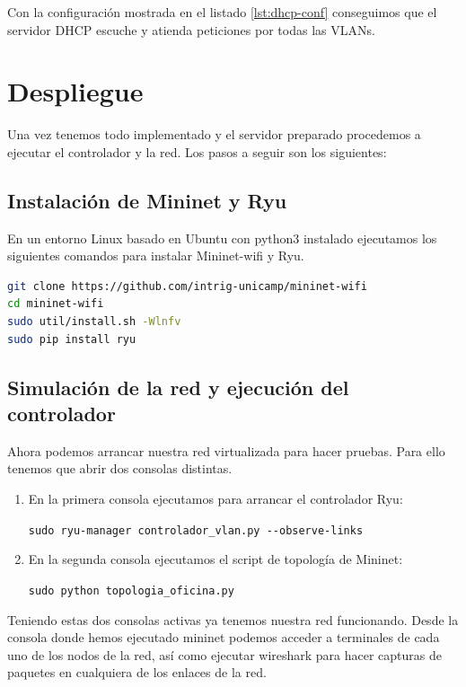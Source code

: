 Con la configuración mostrada en el listado \ref{lst:dhcp-conf} conseguimos que el servidor DHCP escuche y atienda peticiones por todas las VLANs.

\section{Despliegue}

Una vez tenemos todo implementado y el servidor preparado procedemos a ejecutar el controlador y la red. Los pasos a seguir son los siguientes:

\subsection{Instalación de Mininet y Ryu}

En un entorno Linux basado en Ubuntu con python3 instalado ejecutamos los siguientes comandos para instalar Mininet-wifi y Ryu.

\begin{lstlisting}[language=bash, label=lst:install, caption={Instalación de Mininet-wifi y Ryu}]
git clone https://github.com/intrig-unicamp/mininet-wifi
cd mininet-wifi
sudo util/install.sh -Wlnfv
sudo pip install ryu
\end{lstlisting}

\subsection{Simulación de la red y ejecución del controlador}

Ahora podemos arrancar nuestra red virtualizada para hacer pruebas. Para ello tenemos que abrir dos consolas distintas.

\begin{enumerate}
    \item En la primera consola ejecutamos para arrancar el controlador Ryu:

\lstinline{sudo ryu-manager controlador_vlan.py --observe-links}

    \item En la segunda consola ejecutamos el script de topología de Mininet:

\lstinline{sudo python topologia_oficina.py}
\end{enumerate}

Teniendo estas dos consolas activas ya tenemos nuestra red funcionando. Desde la consola donde hemos ejecutado mininet podemos acceder a terminales de cada uno de los nodos de la red, así como ejecutar wireshark para hacer capturas de paquetes en cualquiera de los enlaces de la red.

